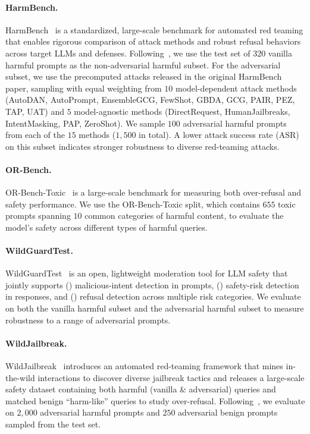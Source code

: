 \documentclass{article}
\begin{document}
\paragraph{HarmBench.} HarmBench~\citep{mazeika2024harmbench} is a standardized, large-scale benchmark for automated red teaming that enables rigorous comparison of attack methods and robust refusal behaviors across target LLMs and defenses. Following~\citet{liu2025chasing}, we use the test set of $320$ vanilla harmful prompts as the non-adversarial harmful subset. For the adversarial subset, we use the precomputed attacks released in the original HarmBench paper, sampling with equal weighting from $10$ model-dependent attack methods (AutoDAN, AutoPrompt, EnsembleGCG, FewShot, GBDA, GCG, PAIR, PEZ, TAP, UAT) and $5$ model-agnostic methods (DirectRequest, HumanJailbreaks, IntentMasking, PAP, ZeroShot). We sample $100$ adversarial harmful prompts from each of the $15$ methods ($1{,}500$ in total). A lower attack success rate (ASR) on this subset indicates stronger robustness to diverse red-teaming attacks.

\paragraph{OR-Bench.} OR-Bench-Toxic~\citep{cui2024orbench} is a large-scale benchmark for measuring both over-refusal and safety performance. We use the OR-Bench-Toxic split, which contains $655$ toxic prompts spanning $10$ common categories of harmful content, to evaluate the model's safety across different types of harmful queries.

\paragraph{WildGuardTest.} WildGuardTest~\citep{han2024wildguard} is an open, lightweight moderation tool for LLM safety that jointly supports () malicious-intent detection in prompts, () safety-risk detection in responses, and () refusal detection across multiple risk categories. We evaluate on both the vanilla harmful subset and the adversarial harmful subset to measure robustness to a range of adversarial prompts.

\paragraph{WildJailbreak.} WildJailbreak~\citep{jiang2024wildteaming} introduces an automated red-teaming framework that mines in-the-wild interactions to discover diverse jailbreak tactics and releases a large-scale safety dataset containing both harmful (vanilla \& adversarial) queries and matched benign ``harm-like'' queries to study over-refusal. Following~\citet{liu2025chasing}, we evaluate on $2{,}000$ adversarial harmful prompts and $250$ adversarial benign prompts sampled from the test set.
\end{document}
